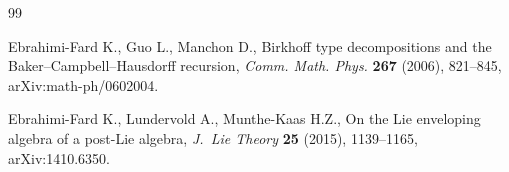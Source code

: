 \documentclass[10pt,a4paper]{article}
\numberwithin{equation}{section}
\begin{document}
\begin{thebibliography}{99}

Ebrahimi-Fard K., Guo L., Manchon D., Birkhoff type decompositions and the
 {B}aker--{C}ampbell--{H}ausdorff recursion, \textit{Comm. Math. Phys.}
 \textbf{267} (2006), 821--845, arXiv:math-ph/0602004.


Ebrahimi-Fard K., Lundervold A., Munthe-Kaas H.Z., On the {L}ie enveloping
 algebra of a post-{L}ie algebra, \textit{J.~Lie Theory} \textbf{25} (2015),
 1139--1165, arXiv:1410.6350.

\end{thebibliography}
\end{document}
